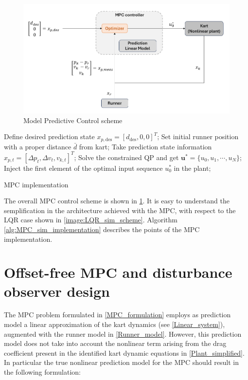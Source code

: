 \documentclass[a4paper,12pt,oneside]{book}
\begin{document}
\begin{figure}
	\centering
	\includegraphics[width=1.0\textwidth]{MPC_sim_scheme.png}
	\caption{Model Predictive Control scheme}
	\label{image:MPC_sim_scheme}
\end{figure}

\begin{algorithm}
\begin{algorithmic}[1]
	\State Define desired prediction state $x_{p,\text{des}} = [d_{\text{des}}, 0, 0]^T$;
	\State Set initial runner position with a proper distance $\bar{d}$ from kart;
		\State Take prediction state information $x_{p,t} = [\Delta p_t, \Delta v_t, v_{k,t}]^T$;
		\State Solve the constrained QP and get $\boldsymbol{u}^* = \{u_0, u_1, \cdots, u_N\}$; 
		\State Inject the first element of the optimal input sequence $u_0^*$ in the plant;
	\EndFor
\caption{MPC implementation}
\label{alg:MPC_sim_implementation}
\end{algorithmic}
\end{algorithm}
\bigskip
The overall MPC control scheme is shown in \ref{image:MPC_sim_scheme}.
It is easy to understand the semplification in the architecture achieved with the MPC, with respect to the LQR case shown in \ref{image:LQR_sim_scheme}.
 Algorithm \ref{alg:MPC_sim_implementation} describes the points of the MPC implementation.

\section{Offset-free MPC and disturbance observer design}
The MPC problem formulated in \ref{MPC_formulation} employs as prediction model a linear approximation of the kart dynamics (see \ref{Linear_system}), augmented with the runner model in \ref{Runner_model}.
However, this prediction model does not take into account the nonlinear term arising from the drag coefficient present in the identified kart dynamic equations in \ref{Plant_simplified}.
In particular the true nonlinear prediction model for the MPC should result in the following formulation:
\end{document}
